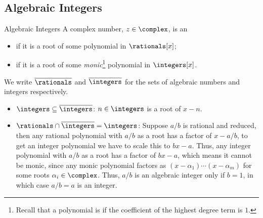 \documentclass[fleqn]{NotesClass}
\newcommand{\algNumbers}{\overline{\rationals}}
\newcommand{\algIntegers}{\overline{\integers}}
\begin{document}
    \subsection{Algebraic Integers}
    \begin{dfn}{Algebraic Integers}{}
        A complex number, \(z \in \complex\), is an
        \begin{itemize}
            \item {} if it is a root of some polynomial in \(\rationals[x]\);
            \item {} if it  is a root of some \emph{monic}\footnote{Recall that a polynomial is  if the coefficient of the highest degree term is \(1\).} polynomial in \(\integers[x]\).
        \end{itemize}
        We write \(\algNumbers\) and \(\algIntegers\) for the sets of algebraic numbers and integers respectively.
    \end{dfn}
    
    \begin{exm}{}{}
        \begin{itemize}
            \item \(\integers \subseteq \algIntegers\): \(n \in \integers\) is a root of \(x - n\).
            \item \(\rationals \cap \algIntegers = \integers\): Suppose \(a/b\) is rational and reduced, then any rational polynomial with \(a/b\) as a root has a factor of \(x - a/b\), to get an integer polynomial we have to scale this to \(bx - a\).
            Thus, any integer polynomial with \(a/b\) as a root has a factor of \(b x - a\), which means it cannot be monic, since any monic polynomial factors as \((x - \alpha_1) \dotsm (x - \alpha_m)\) for some roots \(\alpha_i \in \complex\).
            Thus, \(a/b\) is an algebraic integer only if \(b = 1\), in which case \(a/b = a\) is an integer.
        \end{itemize}
    \end{exm}
    
\end{document}
